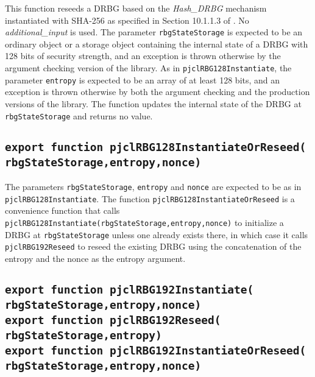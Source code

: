 \documentclass[12pt]{article}
\begin{document}
This function reseeds a DRBG based on the {\em Hash\_DRBG\/} mechanism
instantiated with SHA-256 as specified in Section
10.1.1.3 of \cite{SP800-90Ar1}.  No {\em additional\_input\/} is used.
The parameter {\tt rbgStateStorage} is expected to be an ordinary
object or a storage object 
containing the internal state of a DRBG with 128 bits of security strength,
and an exception is thrown otherwise by the argument checking version of the library.
As in {\tt pjclRBG128Instantiate}, the parameter {\tt entropy} is
expected to be an array of at least 128 bits, and an exception is thrown otherwise by both the
argument checking and the production versions of the library.  The
function updates the internal state of the DRBG at {\tt
  rbgStateStorage} and returns no value.

\subsection{\tt export function pjclRBG128InstantiateOrReseed(\\\mbox{}\hspace{.2in}rbgStateStorage,entropy,nonce)}

The parameters {\tt rbgStateStorage}, {\tt entropy} and {\tt nonce}
are expected to be as in\\
{\tt pjclRBG128Instantiate}.
The function {\tt pjclRBG128InstantiateOrReseed} is a convenience 
function that calls {\tt pjclRBG128Instantiate(rbgStateStorage,entropy,nonce)}
to initialize a DRBG at {\tt rbgStateStorage} unless one already
exists there, in which case it calls {\tt pjclRBG192Reseed}
to reseed the existing DRBG using the concatenation of the entropy
and the nonce as the entropy argument.

\subsection{\tt export function pjclRBG192Instantiate(\\\mbox{}\hspace{.2in}rbgStateStorage,entropy,nonce)\\export function pjclRBG192Reseed(\\\mbox{}\hspace{.2in}rbgStateStorage,entropy)\\export function pjclRBG192InstantiateOrReseed(\\\mbox{}\hspace{.2in}rbgStateStorage,entropy,nonce)}
\end{document}
